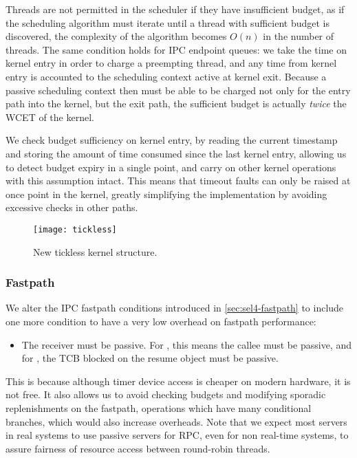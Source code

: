 Threads are not permitted in the scheduler if they have insufficient budget, as if the scheduling
algorithm must iterate until a thread with sufficient budget is discovered, the complexity of the
algorithm becomes $O(n)$ in the number of threads. The same condition holds for IPC endpoint queues:
we take the time on kernel entry in order to charge a preempting thread, and any time from kernel
entry is accounted to the scheduling context active at kernel exit. Because a passive scheduling context
then must be able to be charged not only for the entry path into the kernel, but the exit path, the
sufficient budget is actually \emph{twice} the \gls{WCET} of the kernel.

We check budget sufficiency on kernel entry, by reading the current timestamp and storing 
the amount of time consumed since the last kernel entry, allowing us to detect budget expiry in a single 
point, and carry on other kernel operations with this assumption intact. This means that timeout 
faults can only be raised at once point in the kernel, greatly simplifying the implementation by
avoiding excessive checks in other paths. 

\begin{figure}
    \centering 
    \texttt{[image: tickless]}
    \caption{New tickless kernel structure.}
    \label{figure:tickless}
\end{figure}


\subsubsection{Fastpath}
\label{p:impl-fastpath}

We alter the IPC fastpath conditions introduced in \cref{sec:sel4-fastpath} to include one
more condition to have a very low overhead on fastpath performance:
\begin{itemize}
    \item The receiver must be passive. For \call, this means the callee must be passive, and
          for \replyrecv, the TCB blocked on the resume object must be passive.
\end{itemize}
This is because
although timer device access is cheaper on modern hardware, it is not free. It also allows us to
avoid checking budgets and modifying sporadic replenishments on the fastpath, operations which have
many conditional branches, which would also increase overheads. Note that we expect most servers in
real systems to use passive servers for \gls{RPC}, even for non real-time systems, to assure
fairness of resource access between round-robin threads.  

